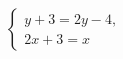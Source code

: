 \begin{ex}[type=ineq_system]
	\begin{condition}
		\( \left\{
		\begin{array}{l}
			y+3=2y-4,\\
			2x+3=x
		\end{array}
		\right. \)
	\end{condition}
\end{ex}